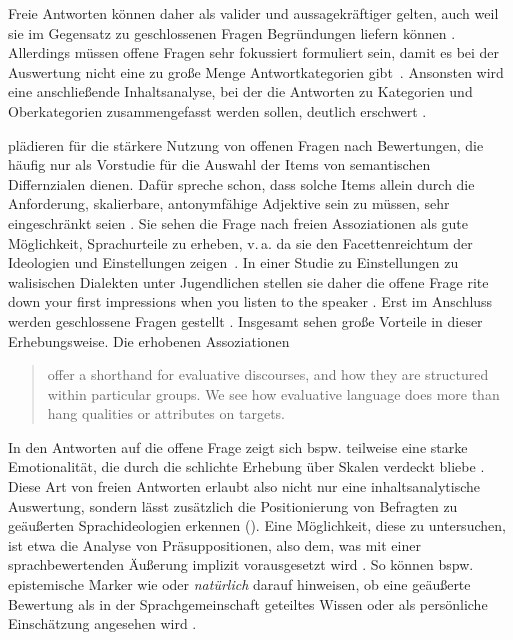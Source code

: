 Freie Antworten können daher als valider und aussagekräftiger gelten, auch weil sie im Gegensatz zu geschlossenen Fragen Begründungen liefern können \citep[s.][182--183]{Studler.2014}.
Allerdings müssen offene Fragen sehr fokussiert formuliert sein, damit es bei der Auswertung nicht eine zu große Menge Antwortkategorien gibt~\citep[s.][62--63]{Porst2014}.
Ansonsten wird eine anschließende Inhaltsanalyse, bei der die Antworten zu Kategorien und Oberkategorien zusammengefasst werden sollen, deutlich erschwert \citep[s.][3]{Schreier.2014}. 

\citet[196]{Garrett.2004} plädieren für die stärkere Nutzung von offenen Fragen nach Bewertungen, die häufig nur als Vorstudie für die Auswahl der Items von semantischen Differnzialen dienen. 
Dafür spreche schon, dass solche Items allein durch die Anforderung, skalierbare, antonymfähige Adjektive sein zu müssen, sehr eingeschränkt seien \citep[s.][196]{Garrett.2004}. 
Sie sehen die Frage nach freien Assoziationen als gute M{\"o}glichkeit, Sprachurteile zu erheben, v.\,a. da sie den Facettenreichtum der Ideologien und Einstellungen zeigen~\citep[s.][215]{Garrett.2004}. 
In einer Studie zu Einstellungen zu walisischen Dialekten unter Jugendlichen stellen sie daher die offene Frage \glqq [w]rite down your first impressions when you listen to the speaker\grqq{} \citep[201]{Garrett.2004}.
Erst im Anschluss werden geschlossene Fragen gestellt \citep[s.][201]{Garrett.2004}. 
Insgesamt sehen \citeauthor{Garrett.2004} große Vorteile in dieser Erhebungsweise. 
Die erhobenen Assoziationen
\begin{quote}offer a shorthand for evaluative discourses, and how they are structured within particular groups. We see how evaluative language does more than hang qualities or attributes on targets. \citep[216]{Garrett.2004}\end{quote}
In den Antworten auf die offene Frage zeigt sich bspw. teilweise eine starke Emotionalität, die durch die schlichte Erhebung über Skalen verdeckt bliebe \citep[s.][216]{Garrett.2004}.
Diese Art von freien Antworten erlaubt also nicht nur eine inhaltsanalytische Auswertung, sondern lässt zusätzlich die Positionierung von Befragten zu geäußerten Sprachideologien erkennen (\cites[s.][119]{Liebscher.2014}[170]{Studler.2014}). 
Eine Möglichkeit, diese zu untersuchen, ist etwa die Analyse von Präsuppositionen, also dem, was mit einer sprachbewertenden Äußerung implizit vorausgesetzt wird \citep[s.][199]{Liebscher.2009}. 
So können bspw. epistemische Marker wie  oder \textit{natürlich} darauf hinweisen, ob eine %
geäußerte %
Bewertung als in der Sprachgemeinschaft geteiltes Wissen oder als persönliche Einschätzung angesehen wird \citep[s.][376]{Deppermann.2015}. 

